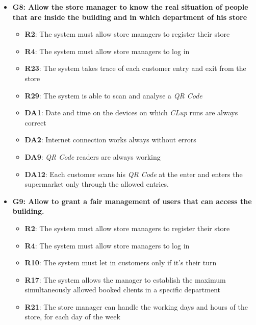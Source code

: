 \documentclass{article}
\begin{document}
\begin{itemize}
\begin{itemize}
					\end{itemize}	


				\item {\bfseries G8: Allow the store manager to know the real situation of people that are inside the building and in which department of his store}	

					\begin{itemize}
						
						\item {\bfseries R2}: The system must allow store managers to register their store
						\item {\bfseries R4}: The system must allow store managers to log in
						\item {\bfseries R23}: The system takes trace of each customer entry and exit from the store
						\item {\bfseries R29}: The system is able to scan and analyse a \emph{QR Code} \\		
				
						\item {\bfseries DA1}: Date and time on the devices on which \emph{CLup} runs are always correct
						\item {\bfseries DA2}: Internet connection works always without errors
						\item {\bfseries DA9}: \emph{QR Code} readers are always working
						\item {\bfseries DA12}: Each customer scans his \emph{QR Code} at the enter and enters the supermarket only through the allowed entries.
							
					\end{itemize}

				\item {\bfseries G9: Allow to grant a fair management of users that can access the building.}	

					\begin{itemize}
						
						\item {\bfseries R2}: The system must allow store managers to register their store
						\item {\bfseries R4}: The system must allow store managers to log in
						\item {\bfseries R10}: The system must let in customers only if it's their turn
						\item {\bfseries R17}: The system allows the manager to establish the maximum simultaneously allowed booked clients in a specific department
						\item {\bfseries R21}: The store manager can handle the working days and hours of the store, for each day of the week
						 

\end{itemize}
\end{itemize}
\end{document}
